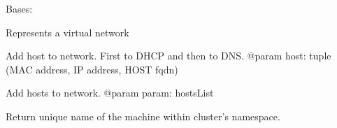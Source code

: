 \documentclass[a4paper,11pt,openany]{sphinxmanual}
\begin{document}
\begin{fulllineitems}
\label{ref-manual/XrdTest:XrdTest.ClusterUtils.Network}
Bases: 

Represents a virtual network

\begin{fulllineitems}
\label{ref-manual/XrdTest:XrdTest.ClusterUtils.Network.addDHCPHost}
\end{fulllineitems}


\begin{fulllineitems}
\label{ref-manual/XrdTest:XrdTest.ClusterUtils.Network.addDnsHost}
\end{fulllineitems}


\begin{fulllineitems}
\label{ref-manual/XrdTest:XrdTest.ClusterUtils.Network.addHost}
Add host to network. First to DHCP and then to DNS.
@param host: tuple (MAC address, IP address, HOST fqdn)

\end{fulllineitems}


\begin{fulllineitems}
\label{ref-manual/XrdTest:XrdTest.ClusterUtils.Network.addHosts}
Add hosts to network.
@param param: hostsList

\end{fulllineitems}


\begin{fulllineitems}
\label{ref-manual/XrdTest:XrdTest.ClusterUtils.Network.uname}
Return unique name of the machine within cluster's namespace.

\end{fulllineitems}



\end{fulllineitems}
\end{document}
